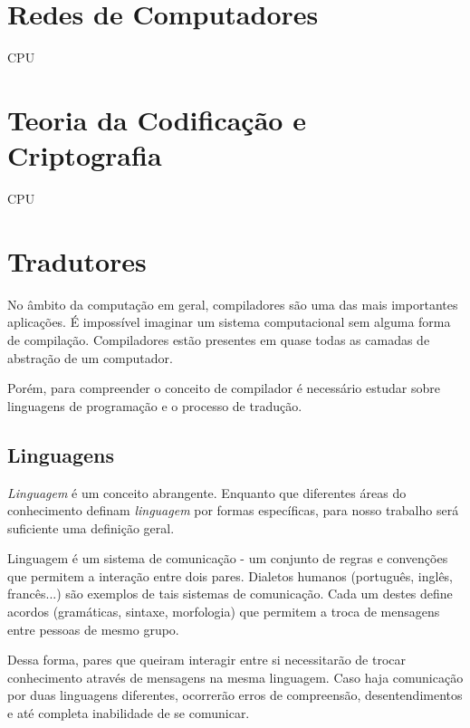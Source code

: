 \section{Redes de Computadores}

CPU

\section{Teoria da Codificação e Criptografia}

CPU

\section{Tradutores}

No âmbito da computação em geral, compiladores são uma das mais importantes
aplicações.  É impossível imaginar um sistema computacional sem alguma forma de
compilação. Compiladores estão presentes em quase todas as camadas de abstração
de um computador.

Porém, para compreender o conceito de compilador é necessário estudar sobre
linguagens de programação e o processo de tradução.

\subsection{Linguagens}

\textit{Linguagem} é um conceito abrangente. Enquanto que diferentes áreas do
conhecimento definam \textit{linguagem} por formas específicas, para nosso
trabalho será suficiente uma definição geral.

Linguagem é um sistema de comunicação - um conjunto de regras e convenções que
permitem a interação entre dois pares. Dialetos humanos (português, inglês,
francês...) são exemplos de tais sistemas de comunicação. Cada um destes define
acordos (gramáticas, sintaxe, morfologia) que permitem a troca de mensagens
entre pessoas de mesmo grupo.

Dessa forma, pares que queiram interagir entre si necessitarão de trocar
conhecimento através de mensagens na mesma linguagem. Caso haja comunicação por
duas linguagens diferentes, ocorrerão erros de compreensão, desentendimentos e
até completa inabilidade de se comunicar.

